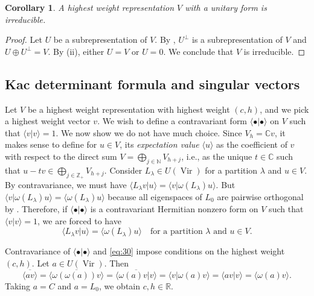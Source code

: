 \documentclass[a4paper, 12pt, reqno]{amsart}
\newtheorem{corollary}[theorem]{Corollary}
\theoremstyle{remark}
\numberwithin{equation}{subsection}
\DeclareMathOperator{\Vir}{Vir}
\begin{document}
\begin{corollary}
  \label{crl:2}
  A highest weight representation $V$ with a unitary form is irreducible.
\end{corollary}

\begin{proof}
  Let $U$ be a subrepresentation of $V$.
  By , $U^{\perp}$ is a subrepresentation of $V$ and $U \oplus U^{\perp} = V$.
  By (ii), either $U = V$ or $U = 0$.
  We conclude that $V$ is irreducible.
\end{proof}

\subsection{Kac determinant formula and singular vectors}
\label{sec:kac-dete-form}

Let $V$ be a highest weight representation with highest weight $(c, h)$, and we pick a highest weight vector $v$.
We wish to define a contravariant form $\langle\bullet| \bullet\rangle$ on $V$ such that $\langle v| v\rangle = 1$.
We now show we do not have much choice.
Since $V_h = \mathbb{C}v$, it makes sense to define for $u \in V$, its \emph{expectation value} $\langle u\rangle$ as the coefficient of $v$ with respect to the direct sum $V = \bigoplus_{j \in \mathbb{N}}V_{h + j}$, i.e., as the unique $t \in \mathbb{C}$ such that $u - tv \in \bigoplus_{j \in \mathbb{Z}_+}V_{h + j}$.
Consider $L_{\lambda} \in U(\Vir)$ for a partition $\lambda$ and $u \in V$.
By contravariance, we must have $\langle L_{\lambda}v| u\rangle = \langle v| \omega(L_{\lambda})u\rangle$.
But $\langle v| \omega(L_{\lambda})u\rangle = \langle\omega(L_{\lambda})u\rangle$ because all eigenspaces of $L_0$ are pairwise orthogonal by .
Therefore, if $\langle\bullet| \bullet\rangle$ is a contravariant Hermitian nonzero form on $V$ such that $\langle v| v\rangle = 1$, we are forced to have
\begin{equation}
  \label{eq:30}
  \langle L_{\lambda}v| u\rangle = \langle\omega(L_{\lambda})u\rangle \quad \text{for a partition }\lambda\text{ and }u \in V.
\end{equation}

Contravariance of $\langle\bullet| \bullet\rangle$ and \eqref{eq:30} impose conditions on the highest weight $(c, h)$.
Let $a \in U(\Vir)$.
Then
\begin{equation*}
  \overline{\langle av\rangle} = \overline{\langle\omega(\omega(a))v\rangle} = \overline{\langle\omega(a)v| v\rangle} = \langle v| \omega(a)v\rangle = \langle av| v\rangle = \langle\omega(a)v\rangle.
\end{equation*}
Taking $a = C$ and $a = L_0$, we obtain $c, h \in \mathbb{R}$.
\end{document}
